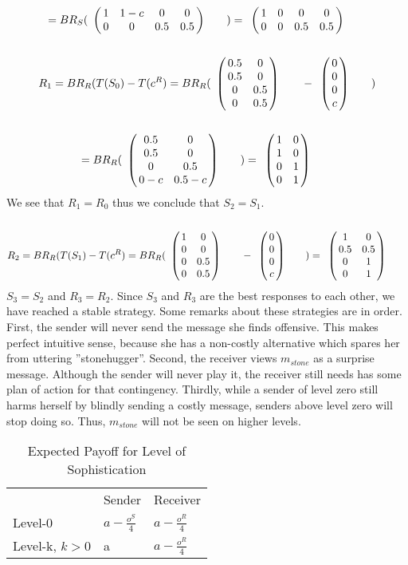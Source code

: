 \documentclass[10]{article}
\begin{document}
\begin{equation*}
=BR_S(
\bordermatrix{
                & & & &    \cr
     &       1 &         1-c & 0       & 0 \cr
     &       0 &         0 & 0.5      & 0.5
 }\qquad
 )
=
\bordermatrix{
                 & & & &    \cr
      &       1 &         0 & 0       & 0 \cr
      &       0 &         0 & 0.5      & 0.5
  }\qquad
\end{equation*}
\begin{equation*}
R_1=BR_R(T(S_0)-T(c^R)=
BR_R(
\bordermatrix{
            &  & \cr
    & 0.5 & 0 \cr
     & 0.5 & 0 \cr
     & 0 & 0.5 \cr
     & 0 & 0.5 \cr
 }\qquad
-
\bordermatrix{
  & \cr
    & 0 \cr
     & 0 \cr
     & 0 \cr
     & c \cr
 }\qquad
)
\end{equation*}
\begin{equation*}
=
BR_R(
\bordermatrix{
            &  & \cr
    & 0.5 & 0 \cr
     & 0.5 & 0 \cr
     & 0 & 0.5 \cr
     & 0-c & 0.5-c \cr
 }\qquad)
=
\bordermatrix{
            &  & \cr
    & 1 & 0 \cr
     & 1 & 0 \cr
     & 0 & 1 \cr
     & 0 & 1 \cr
 }\qquad
\end{equation*}
We see that $R_1=R_0$ thus we conclude that $S_2=S_1$.
\begin{equation*}
R_2=BR_R(T(S_1)-T(c^R)=
BR_R(
\bordermatrix{
            &  & \cr
    & 1 & 0 \cr
     & 0 & 0 \cr
     & 0 & 0.5 \cr
     & 0 & 0.5 \cr
 }\qquad
-
\bordermatrix{
  & \cr
    & 0 \cr
     & 0 \cr
     & 0 \cr
     & c \cr
 }\qquad
)
=
\bordermatrix{
            &  & \cr
    & 1 & 0 \cr
     & 0.5 & 0.5 \cr
     & 0 & 1 \cr
     & 0 & 1 \cr
 }\qquad
\end{equation*}
$S_3=S_2$ and $R_3=R_2$. Since $S_3$ and $R_3$ are the best responses to each other, we have reached a stable strategy. 
Some remarks about these strategies are in order. First, the sender will never send the message she finds offensive. This makes perfect intuitive sense, because she has a non-costly alternative which spares her from uttering ''stonehugger''. Second, the receiver views $m_{stone}$ as a surprise message. Although the sender will never play it, the receiver still needs has some plan of action for that contingency. Thirdly, while a sender of level zero still harms herself by blindly sending a costly message, senders above level zero will stop doing so. Thus, $m_{stone}$ will not be seen on higher levels. 

\begin{table}[h]
\centering
\caption{Expected Payoff for Level of Sophistication}
\label{my-label}
\begin{tabular}{lll}
                                    & Sender                                  & Receiver                                \\ \cline{2-3}
\multicolumn{1}{l|}{Level-0}        & \multicolumn{1}{l|}{$a-\tfrac{o^S}{4}$} & \multicolumn{1}{l|}{$a-\tfrac{o^R}{4}$} \\ \cline{2-3}
\multicolumn{1}{l|}{Level-k, $k>0$} & \multicolumn{1}{l|}{a}                  & \multicolumn{1}{l|}{$a-\tfrac{o^R}{4}$} \\ \cline{2-3}
\end{tabular}
\end{table}
\end{document}
